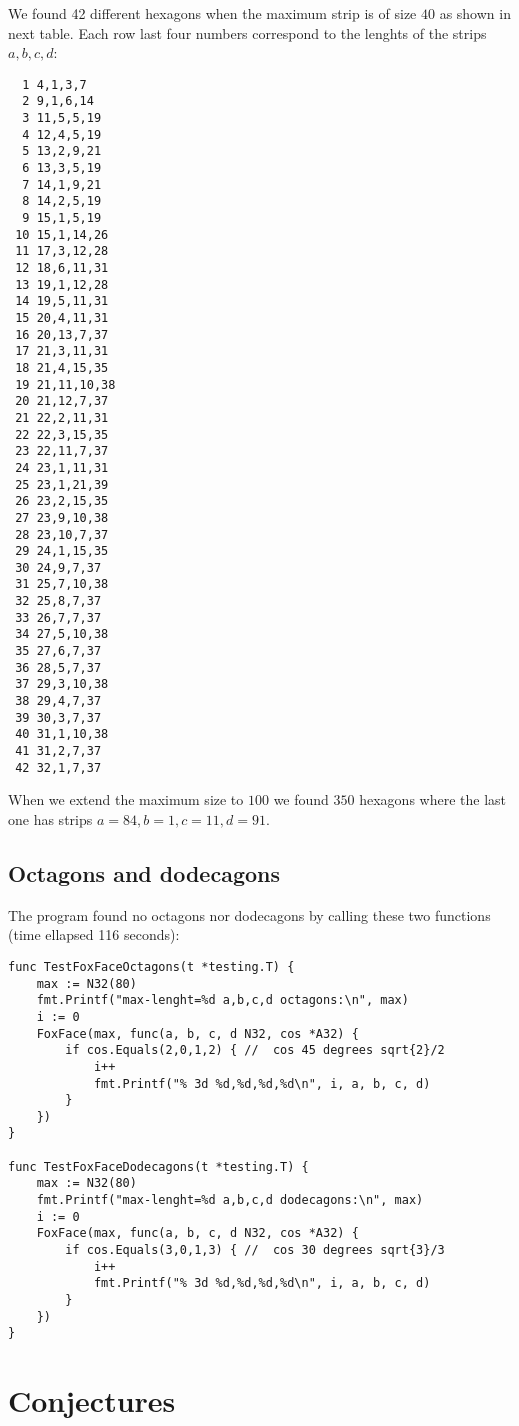 \documentclass[11pt]{article}
\begin{document}
We found 42 different hexagons when the maximum strip is of size $40$ as shown in next table.
Each row last four numbers correspond to the lenghts of the strips $a,b,c,d$:
\setlength{\columnsep}{200pt}
\begin{multicols}{2}
\begin{lstlisting}
  1 4,1,3,7
  2 9,1,6,14
  3 11,5,5,19
  4 12,4,5,19
  5 13,2,9,21
  6 13,3,5,19
  7 14,1,9,21
  8 14,2,5,19
  9 15,1,5,19
 10 15,1,14,26
 11 17,3,12,28
 12 18,6,11,31
 13 19,1,12,28
 14 19,5,11,31
 15 20,4,11,31
 16 20,13,7,37
 17 21,3,11,31
 18 21,4,15,35
 19 21,11,10,38
 20 21,12,7,37
 21 22,2,11,31
 22 22,3,15,35
 23 22,11,7,37
 24 23,1,11,31
 25 23,1,21,39
 26 23,2,15,35
 27 23,9,10,38
 28 23,10,7,37
 29 24,1,15,35
 30 24,9,7,37
 31 25,7,10,38
 32 25,8,7,37
 33 26,7,7,37
 34 27,5,10,38
 35 27,6,7,37
 36 28,5,7,37
 37 29,3,10,38
 38 29,4,7,37
 39 30,3,7,37
 40 31,1,10,38
 41 31,2,7,37
 42 32,1,7,37
\end{lstlisting}
\end{multicols}
When we extend the maximum size to $100$ we found $350$ hexagons where the last one
has strips $a=84, b=1, c=11, d=91$.

\subsection{Octagons and dodecagons}

The program found no octagons nor dodecagons by calling these two functions (time ellapsed 116 seconds):
\begin{lstlisting}
func TestFoxFaceOctagons(t *testing.T) {
	max := N32(80)
	fmt.Printf("max-lenght=%d a,b,c,d octagons:\n", max)
	i := 0
	FoxFace(max, func(a, b, c, d N32, cos *A32) {
		if cos.Equals(2,0,1,2) { //  cos 45 degrees sqrt{2}/2
			i++
			fmt.Printf("% 3d %d,%d,%d,%d\n", i, a, b, c, d)
		}
	})
}

func TestFoxFaceDodecagons(t *testing.T) {
	max := N32(80)
	fmt.Printf("max-lenght=%d a,b,c,d dodecagons:\n", max)
	i := 0
	FoxFace(max, func(a, b, c, d N32, cos *A32) {
		if cos.Equals(3,0,1,3) { //  cos 30 degrees sqrt{3}/3
			i++
			fmt.Printf("% 3d %d,%d,%d,%d\n", i, a, b, c, d)
		}
	})
}
\end{lstlisting}

\section{Conjectures}
\end{document}
